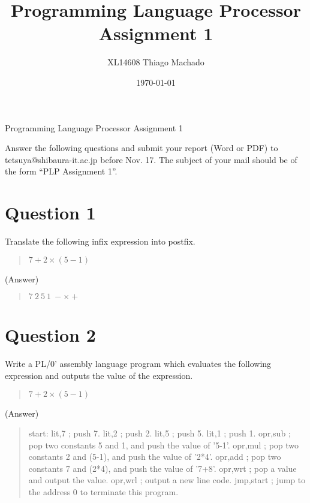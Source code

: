 \documentclass{article}
\title{Programming Language Processor \\ Assignment 1}
\author{XL14608 Thiago Machado}
\date{\today}
\begin{document}
\ifreport
\maketitle
\else
\begin{center}
{\huge Programming Language Processor Assignment 1}
\end{center}
Answer the following questions and submit your report (Word or PDF) to
tetsuya@shibaura-it.ac.jp before Nov. 17. 
The subject of your mail should be of the form ``PLP Assignment 1''.
\fi


\section*{Question 1}
Translate the following infix expression into postfix.
\begin{quote}
 $7 + 2 \times (5 - 1)$
\end{quote}

\ifreport
(Answer)\\
\fi
\begin{quote}
 $7\ 2\ 5\ 1\ - \times +$
\end{quote}



\section*{Question 2}
Write a PL/0' assembly language program which evaluates the following
expression and outputs the value of the expression.
\begin{quote}
 $7 + 2 \times (5 - 1)$
\end{quote}

\ifreport
(Answer)\\
\fi
\begin{quote}
start:
	lit,7     ; push 7.\newline
	lit,2     ; push 2.\newline
	lit,5     ; push 5.\newline
	lit,1     ; push 1.\newline
	opr,sub   ; pop two constants 5 and 1, and push the value of '5-1'.\newline
	opr,mul   ; pop two constants 2 and (5-1), and push the value of '2*4'.\newline
	opr,add   ; pop two constants 7 and (2*4), and push the value of '7+8'.\newline
	opr,wrt   ; pop a value and output the value.\newline
	opr,wrl   ; output a new line code.\newline
	jmp,start ; jump to the address 0 to terminate this program.\newline
\end{quote}

\end{document}
